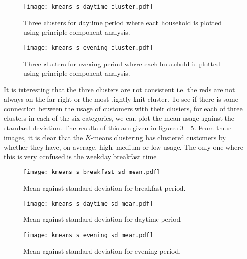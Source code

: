 \documentclass[a4paper]{article}
\begin{document}
\begin{figure}
\centering
\texttt{[image: kmeans\_s\_daytime\_cluster.pdf]}
\caption{\label{fig:kmeans_day}Three clusters for daytime period where each household is plotted using principle component analysis.}
\end{figure}

\begin{figure}
\centering
\texttt{[image: kmeans\_s\_evening\_cluster.pdf]}
\caption{\label{fig:kmeans_eve} Three clusters for evening period where each household is plotted using principle component analysis.}
\end{figure}

It is interesting that the three clusters are not consistent i.e. the reds are not always on the far right or the most tightly knit cluster. To see if there is some connection between the usage of customers with their clusters, for each of three clusters in each of the six categories, we can plot the mean usage against the standard deviation. The results of this are given in figures \ref{fig:kmeans_break_sm} - \ref{fig:kmeans_eve_sm}. From these images, it is clear that the $K$-means clustering has clustered customers by whether they have, on average, high, medium or low usage. The only one where this is very confused is the weekday breakfast time. 

\begin{figure}
\centering
\texttt{[image: kmeans\_s\_breakfast\_sd\_mean.pdf]}
\caption{\label{fig:kmeans_break_sm} Mean against standard deviation for breakfast period.}
\end{figure}

\begin{figure}
\centering
\texttt{[image: kmeans\_s\_daytime\_sd\_mean.pdf]}
\caption{\label{fig:kmeans_day_sm}Mean against standard deviation for daytime period.}
\end{figure}

\begin{figure}
\centering
\texttt{[image: kmeans\_s\_evening\_sd\_mean.pdf]}
\caption{\label{fig:kmeans_eve_sm}Mean against standard deviation for evening period.}
\end{figure}
\end{document}
